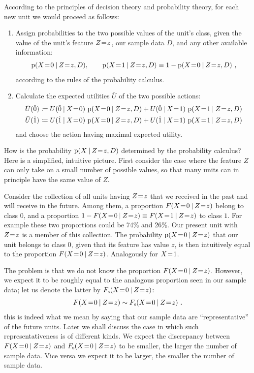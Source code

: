 \documentclass[\ifafour a4paper,12pt,\else a5paper,10pt,\fi%
onecolumn,oneside,article,%
british%
]{memoir}
\theoremstyle{remark}
\theoremstyle{innote}
\newcommand*{\defd}{\coloneqq}
\newcommand*{\p}{\mathrm{p}}%
\renewcommand*{\|}[1][]{\nonscript\:#1\vert\nonscript\:\mathopen{}}
\newcommand*{\mo}[1][=]{\mathrel{\mkern-3.5mu#1\mkern-3.5mu}}
\newcommand*{\Fs}{F_{\textrm{s}}}
\newcommand*{\za}{\hat{0}}
\newcommand*{\zb}{\hat{1}}
\newcommand*{\eu}{\bar{U}}
\begin{document}
According to the principles of decision theory and probability theory, for each new unit we would proceed as follows:
\begin{enumerate}[label=\arabic*.]
\item Assign probabilities to the two possible values of the unit's class, given the value of the unit's feature $Z\mo z$, our sample data $D$, and any other available information:
  \begin{equation}
    \p(X\mo 0 \| Z\mo z, D), \qquad \p(X\mo 1 \| Z\mo z,D) \equiv 1- \p(X\mo 0 \| Z\mo z,D) \ ,
  \end{equation}
  according to the rules of the probability calculus.
\item Calculate the expected utilities $\eu$ of the two possible actions:
  \begin{equation}
    \begin{aligned}
      \eu(\za) &\defd U(\za \| X\mo 0) \ 
                 \p(X\mo 0 \| Z\mo z, D) + U(\za \| X\mo 1) \ 
                 \p(X\mo 1 \| Z\mo z, D)
      \\
      \eu(\zb) &\defd U(\zb \| X\mo 0) \ 
                 \p(X\mo 0 \| Z\mo z, D) + U(\zb \| X\mo 1) \ 
                 \p(X\mo 1 \| Z\mo z, D)
    \end{aligned}
\end{equation}
  and choose the action having maximal expected utility.
\end{enumerate}

\medskip

How is the probability $\p(X \| Z\mo z, D)$ determined by the probability calculus? Here is a simplified, intuitive picture. First consider the case where the feature $Z$ can only take on a small number of possible values, so that many units can in principle have the same value of $Z$.

Consider the collection of all units having $Z\mo z$ that we received in the past and will receive in the future. Among them, a proportion $F(X\mo 0 \| Z\mo z)$ belong to class $0$, and a proportion $1 - F(X\mo 0 \| Z\mo z) \equiv F(X\mo 1 \| Z\mo z)$ to class $1$. For example these two proportions could be 74\% and 26\%. Our present unit with $Z\mo z$ is a member of this collection. The probability $\p(X\mo 0 \| Z\mo z)$ that our unit belongs to class $0$, given that its feature has value $z$, is then intuitively equal to the proportion $F(X\mo 0 \| Z\mo z)$. Analogously for $X\mo 1$.

The problem is that we do not know the proportion $F(X\mo 0 \| Z\mo z)$. However, we expect it to be roughly equal to the analogous proportion seen in our sample data; let us denote the latter by $\Fs(X\mo 0 \| Z\mo z)$:
\begin{equation}
  \label{eq:approx_repres}
  F(X\mo 0 \| Z\mo z) \sim \Fs(X\mo 0 \| Z\mo z) \ .
\end{equation}
this is indeed what we mean by saying that our sample data are \enquote{representative} of the future units. Later we shall discuss the case in which such representativeness is of different kinds. We expect the discrepancy between $F(X\mo 0 \| Z\mo z)$ and $\Fs(X\mo 0 \| Z\mo z)$ to be smaller, the larger the number of sample data. Vice versa we expect it to be larger, the smaller the number of sample data.
\end{document}
